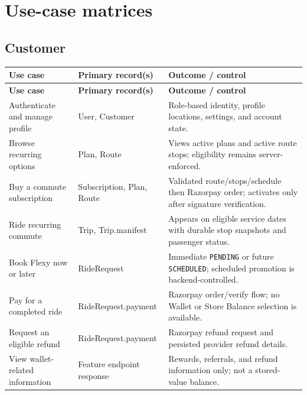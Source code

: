 \documentclass[11pt,a4paper]{article}
\newcommand{\code}[1]{\texttt{#1}}
\begin{document}
\section{Use-case matrices}
\subsection{Customer}
\begin{longtable}{p{} p{} Z}
\toprule
\textbf{Use case} & \textbf{Primary record(s)} & \textbf{Outcome / control} \\
\midrule
\endfirsthead
\toprule
\textbf{Use case} & \textbf{Primary record(s)} & \textbf{Outcome / control} \\
\midrule
\endhead
Authenticate and manage profile & User, Customer & Role-based identity, profile locations, settings, and account state. \\
Browse recurring options & Plan, Route & Views active plans and active route stops; eligibility remains server-enforced. \\
Buy a commute subscription & Subscription, Plan, Route & Validated route/stops/schedule then Razorpay order; activates only after signature verification. \\
Ride recurring commute & Trip, Trip.manifest & Appears on eligible service dates with durable stop snapshots and passenger status. \\
Book Flexy now or later & RideRequest & Immediate \code{PENDING} or future \code{SCHEDULED}; scheduled promotion is backend-controlled. \\
Pay for a completed ride & RideRequest.payment & Razorpay order/verify flow; no Wallet or Store Balance selection is available. \\
Request an eligible refund & RideRequest.payment & Razorpay refund request and persisted provider refund details. \\
View wallet-related information & Feature endpoint response & Rewards, referrals, and refund information only; not a stored-value balance. \\
\bottomrule
\end{longtable}
\end{document}
